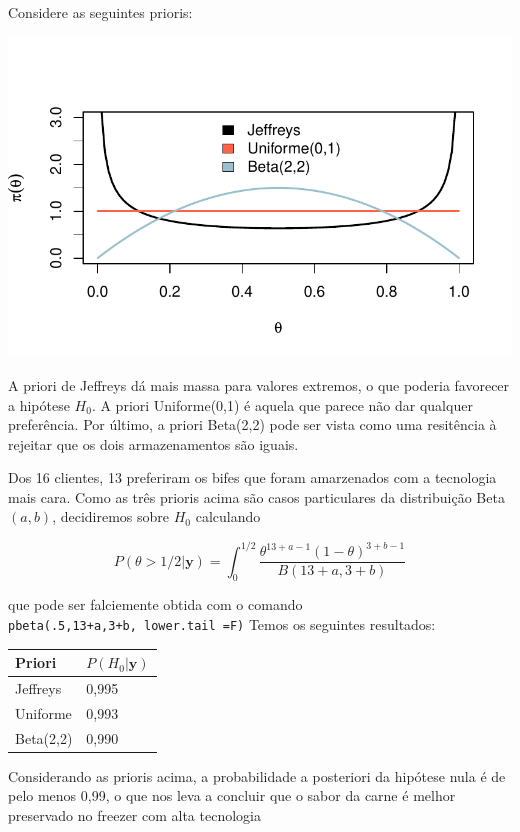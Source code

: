 \documentclass[
  letterpaper,
  DIV=11,
  numbers=noendperiod]{scrreprt}
\theoremstyle{plain}
\theoremstyle{definition}
\theoremstyle{definition}
\theoremstyle{remark}
\begin{document}
Considere as seguintes prioris:

\includegraphics{teste_files/figure-pdf/unnamed-chunk-1-1.pdf}

A priori de Jeffreys dá mais massa para valores extremos, o que poderia
favorecer a hipótese \(H_0\). A priori Uniforme(0,1) é aquela que parece
não dar qualquer preferência. Por último, a priori Beta(2,2) pode ser
vista como uma resitência à rejeitar que os dois armazenamentos são
iguais.

Dos 16 clientes, 13 preferiram os bifes que foram amarzenados com a
tecnologia mais cara. Como as três prioris acima são casos particulares
da distribuição Beta\((a,b)\), decidiremos sobre \(H_0\) calculando

\[P(\theta>1/2|\textbf{y})=\int_0^{1/2}\frac{\theta^{13+a-1}(1-\theta)^{3+b-1}}{B(13+a,3+b)}\]

que pode ser falciemente obtida com o comando
\texttt{pbeta(.5,13+a,3+b,\ lower.tail\ =F)} Temos os seguintes
resultados:

\begin{longtable}[]{@{}ll@{}}
\toprule\noalign{}
Priori & \(P(H_0|\textbf{y})\) \\
\midrule\noalign{}
\endhead
\bottomrule\noalign{}
\endlastfoot
Jeffreys & 0,995 \\
Uniforme & 0,993 \\
Beta(2,2) & 0,990 \\
\end{longtable}

Considerando as prioris acima, a probabilidade a posteriori da hipótese
nula é de pelo menos 0,99, o que nos leva a concluir que o sabor da
carne é melhor preservado no freezer com alta tecnologia
\end{document}
